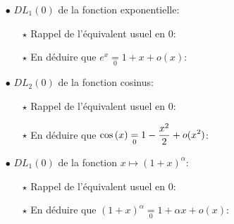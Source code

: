 \documentclass[a4paper, 11pt]{article}
\begin{document}
\begin{itemize}
\item[$\bullet$] $DL_1(0)$ de la fonction exponentielle:
\begin{itemize}
\item[$\star$] Rappel de l'\'equivalent usuel en 0: \dotfill \phantom{\hspace{6cm} }
\item[$\star$] En d\'eduire que $e^x\underset{0}{=} 1+x+o(x)$:\\


\end{itemize}
\item[$\bullet$] $DL_2(0)$ de la fonction cosinus:
\begin{itemize}
\item[$\star$] Rappel de l'\'equivalent usuel en 0: \dotfill \phantom{\hspace{6cm} }
\item[$\star$] En d\'eduire que $\cos{(x)}\underset{0}{=} 1-\displaystyle\frac{x^2}{2}+o(x^2)$:\\


\end{itemize}
\item[$\bullet$] $DL_1(0)$ de la fonction $x\mapsto (1+x)^{\alpha}$:
\begin{itemize}
\item[$\star$] Rappel de l'\'equivalent usuel en 0: \dotfill \phantom{\hspace{6cm} }
\item[$\star$] En d\'eduire que $(1+x)^{\alpha}\underset{0}{=} 1+\alpha x+o(x)$:\\


\end{itemize}
\end{itemize}
\end{document}

